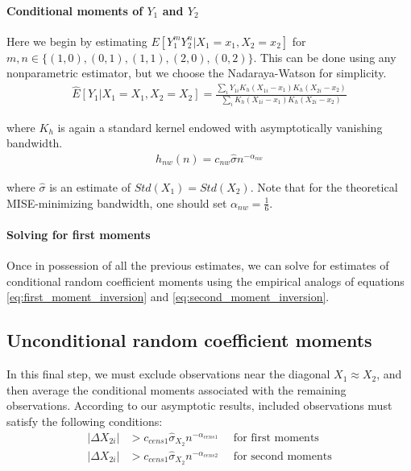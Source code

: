 \paragraph{Conditional moments of $Y_1$ and $Y_2$} Here we begin by estimating $E[Y_1^{m} Y_2^{n}|X_1 = x_1, X_2 = x_2]$ for $m,n \in \{ (1,0), (0,1), (1,1), (2,0), (0,2)\}$. This can be done using any nonparametric estimator, but we choose the Nadaraya-Watson for simplicity.
\begin{align}
  \widehat{E}[Y_1|X_1 = X_1, X_2 = X_2] =
  \frac{\sum_i Y_{1i}K_h(X_{1i} - x_1) K_h(X_{2i} - x_2)}
  {\sum_i K_h(X_{1i} - x_1) K_h(X_{2i} - x_2)}
\end{align}

\noindent where $K_h$ is again a standard kernel endowed with asymptotically vanishing bandwidth.
\begin{align}
  h_{nw}(n) = c_{nw}\hat{\sigma} n^{-\alpha_{nw}}
\end{align}

\noindent where $\hat{\sigma}$ is an estimate of $Std(X_1) = Std(X_2)$. Note that for the theoretical MISE-minimizing bandwidth, one should set $\alpha_{nw} = \frac{1}{6}$. 

\paragraph{Solving for first moments} Once in possession of all the previous estimates, we can solve for estimates of conditional random coefficient moments using the empirical analogs of equations \ref{eq:first_moment_inversion} and \ref{eq:second_moment_inversion}.
  

\subsection*{Unconditional random coefficient moments}

In this final step, we must exclude observations near the diagonal $X_1 ≈ X_2$, and then average the conditional moments associated with the remaining observations. According to our asymptotic results, included observations must satisfy the following conditions:
\begin{align}
  |\Delta X_{2i}| &> c_{cens1} \hat{\sigma}_{X_2} n^{-\alpha_{cens1}} \quad \text{ for first moments}\\
  |\Delta X_{2i}| &> c_{cens1} \hat{\sigma}_{X_2} n^{-\alpha_{cens2}} \quad \text{ for second moments}
\end{align}
  
